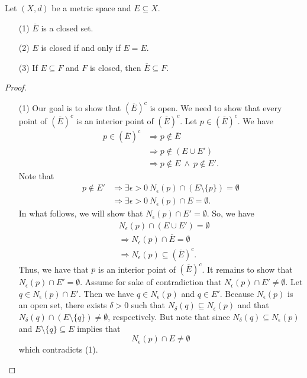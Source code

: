 \documentclass[a4paper]{report}
\begin{document}
\begin{theorem}[ ]
Let \( (X,d) \) be a metric space and \( E \subseteq X  \).
\begin{enumerate}
    \item[(1)] \( \overline{E} \) is a closed set. 
    \item[(2)] \( E  \) is closed if and only if \( E = \overline{E} \).
    \item[(3)] If \( E \subseteq F  \) and \( F \) is closed, then \( \overline{E} \subseteq F  \).
\end{enumerate}
\end{theorem}
\begin{proof}
    \begin{enumerate}
        \item[(1)] Our goal is to show that \( (\overline{E})^{c} \) is open. We need to show that every point of \( (\overline{E})^{c} \) is an interior point of \( (\overline{E})^{c} \). Let \( p \in (\overline{E})^{c} \). We have 
\begin{align*}
    p \in (\overline{E})^{c} &\Longrightarrow p \notin \overline{E} \\ 
                             &\Longrightarrow p \notin (E \cup E') \\
                             &\Longrightarrow p \notin E \ \wedge \ p \notin E'.
\end{align*}
Note that 
\begin{align*}
    p \notin E' &\Longrightarrow \exists \epsilon > 0 \ {N}_{\epsilon}(p) \cap (E \setminus \{ p \} ) = \emptyset \\
                &\Longrightarrow \exists \epsilon > 0 \ {N}_{\epsilon}(p) \cap E = \emptyset. \tag{1}
\end{align*}
In what follows, we will show that \( {N}_{\epsilon}(p) \cap E' = \emptyset \). So, we have
\begin{align*}
    &{N}_{\epsilon}(p) \cap (E \cup E') = \emptyset \\
                                       &\Longrightarrow {N}_{\epsilon}(p) \cap \overline{E} = \emptyset \\
                                       &\Longrightarrow {N}_{\epsilon}(p) \subseteq (\overline{E})^{c}.
\end{align*}
Thus, we have that \( p  \) is an interior point of \( (\overline{E})^{c}\). It remains to show that \( {N}_{\epsilon}(p) \cap E'  = \emptyset\). Assume for sake of contradiction that \( {N}_{\epsilon}(p) \cap E' \neq \emptyset \). Let \( q \in {N}_{\epsilon}(p) \cap E' \). Then we have \( q \in {N}_{\epsilon}(p)  \) and \( q \in E' \). Because \( {N}_{\epsilon}(p) \) is an open set, there exists \( \delta > 0  \) such that \( {N}_{\delta}(q) \subseteq {N}_{\epsilon}(p) \) and that \( {N}_{\delta}(q) \cap (E \setminus  \{ q \} ) \neq \emptyset \), respectively. But note that since \( {N}_{\delta}(q) \subseteq  {N}_{\epsilon}(p)  \) and \( E \setminus  \{ q  \} \subseteq E   \) implies that 
\[  {N}_{\epsilon}(p) \cap E \neq \emptyset \]
which contradicts (1).
    \end{enumerate}
\end{proof}
\end{document}
